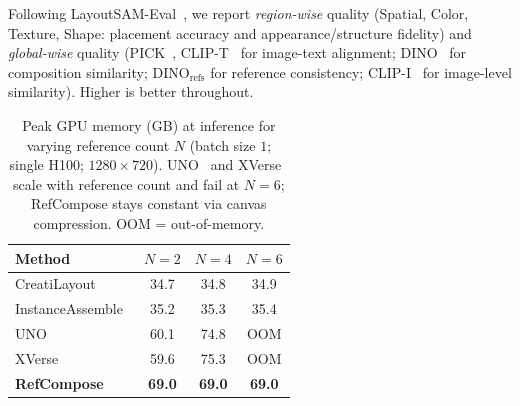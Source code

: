 Following LayoutSAM-Eval~\cite{xiang2025instanceassemble}, we report \emph{region-wise} quality (Spatial, Color, Texture, Shape: placement accuracy and appearance/structure fidelity) and \emph{global-wise} quality (PICK~\cite{kirstain2023pickapic}, CLIP-T~\cite{radford2021clip} for image-text alignment; DINO~\cite{caron2021dino} for composition similarity; DINO$_{\text{refs}}$ for reference consistency; CLIP-I~\cite{radford2021clip} for image-level similarity). Higher is better throughout.

\begin{table}[t]
  \centering
  \caption{Peak GPU memory (GB) at inference for varying reference count $N$ (batch size $1$; single H100; $1280 \times 720$). UNO~\cite{wu2025uno} and XVerse~\cite{xverse2024} scale with reference count and fail at $N{=}6$; RefCompose stays constant via canvas compression. OOM = out-of-memory.}
  \label{tab:memory}
  \setlength{\tabcolsep}{5pt}
  \begin{tabular}{lccc}
    \toprule
    \textbf{Method} & $N{=}2$ & $N{=}4$ & $N{=}6$ \\
    \midrule
    CreatiLayout~\cite{tang2024creatilayout} & 34.7 & 34.8 & 34.9 \\
    InstanceAssemble~\cite{xiang2025instanceassemble} & 35.2 & 35.3 & 35.4 \\
    UNO~\cite{wu2025uno} & 60.1 & 74.8 & OOM \\
    XVerse~\cite{xverse2024} & 59.6 & 75.3 & OOM \\
    \midrule
    \textbf{RefCompose} & \textbf{69.0} & \textbf{69.0} & \textbf{69.0} \\
    \bottomrule
  \end{tabular}
\end{table}

